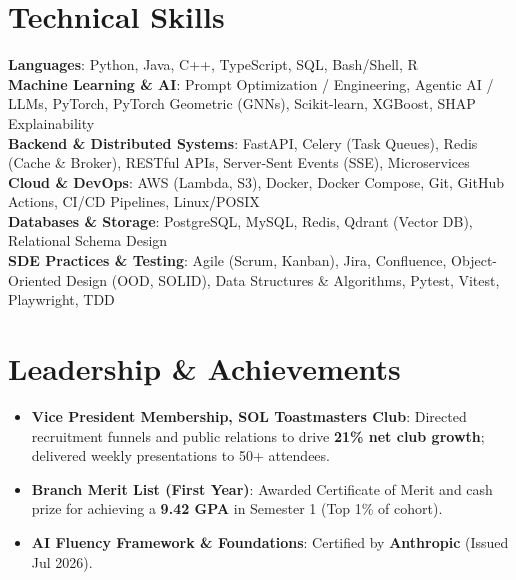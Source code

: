 \documentclass[letterpaper,10pt]{article}
\newcommand{\resumeItem}[1]{
  \item\small{
    {#1 \vspace{-2pt}}
  }
}
\newcommand{\resumeItemListStart}{\begin{itemize}[leftmargin=0.15in, label=\textbullet]}
\newcommand{\resumeItemListEnd}{\end{itemize}\vspace{-5pt}}
\begin{document}
\section{Technical Skills}
 \begin{itemize}[leftmargin=0.15in, label={}]
    \small{\item{
     \textbf{Languages}{: Python, Java, C++, TypeScript, SQL, Bash/Shell, R} \\
     \textbf{Machine Learning \& AI}{: Prompt Optimization / Engineering, Agentic AI / LLMs, PyTorch, PyTorch Geometric (GNNs), Scikit-learn, XGBoost, SHAP Explainability} \\
     \textbf{Backend \& Distributed Systems}{: FastAPI, Celery (Task Queues), Redis (Cache \& Broker), RESTful APIs, Server-Sent Events (SSE), Microservices} \\
     \textbf{Cloud \& DevOps}{: AWS (Lambda, S3), Docker, Docker Compose, Git, GitHub Actions, CI/CD Pipelines, Linux/POSIX} \\
     \textbf{Databases \& Storage}{: PostgreSQL, MySQL, Redis, Qdrant (Vector DB), Relational Schema Design} \\
     \textbf{SDE Practices \& Testing}{: Agile (Scrum, Kanban), Jira, Confluence, Object-Oriented Design (OOD, SOLID), Data Structures \& Algorithms, Pytest, Vitest, Playwright, TDD}
    }}
 \end{itemize}
\vspace{-14pt}


\section{Leadership \& Achievements}
  \resumeItemListStart
    \resumeItem{\textbf{Vice President Membership, SOL Toastmasters Club}{: Directed recruitment funnels and public relations to drive \textbf{21\% net club growth}; delivered weekly presentations to 50+ attendees.}}
    \resumeItem{\textbf{Branch Merit List (First Year)}{: Awarded Certificate of Merit and cash prize for achieving a \textbf{9.42 GPA} in Semester 1 (Top 1\% of cohort).}}
    \resumeItem{\textbf{AI Fluency Framework \& Foundations}{: Certified by \textbf{Anthropic} (Issued Jul 2026).}}
  \resumeItemListEnd
\end{document}
